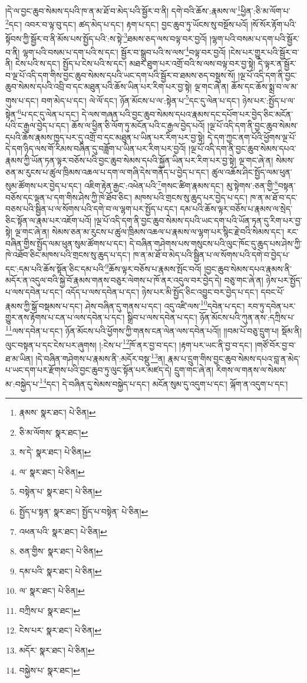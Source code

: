 །དེ་ལ་བྱང་ཆུབ་སེམས་དཔའི་ཁ་ན་མ་ཐོ་བ་མེད་པའི་སྦྱོར་བ་ནི། དགེ་བའི་ཆོས་:རྣམས་ལ་\footnote{རྣམས་  སྣར་ཐང་།  པེ་ཅིན། }ཕྱིན་:ཅི་མ་ལོག་པ་\footnote{ཅི་མ་ལོགས་  སྣར་ཐང་། }དང་། འབར་བ་ལྟ་བུ་དང་། ཚད་མེད་པ་དང་། རྟག་པ་དང་། བྱང་ཆུབ་ཏུ་ཡོངས་སུ་བསྔོས་པའོ། །སོ་སོར་རྟོག་པའི་སྟོབས་ཀྱི་སྦྱོར་བ་ནི་མོས་པས་སྤྱོད་པའི་:ས་སྟེ་\footnote{ས་དེ་  སྣར་ཐང་།  པེ་ཅིན། }ཐམས་ཅད་ལས་བལྟ་བར་བྱའོ། །ལྷག་པའི་བསམ་པ་དག་པའི་སྦྱོར་བ་ནི། ལྷག་པའི་བསམ་པ་དག་པའི་ས་དང་། སྦྱོར་བ་སྒྲུབ་པའི་ས་ལས་\footnote{ལ་  སྣར་ཐང་།  པེ་ཅིན། }བལྟ་བར་བྱའོ། །ངེས་པར་གྱུར་པའི་སྦྱོར་བ་ནི། ངེས་པའི་ས་དང་། སྤྱོད་པ་ངེས་པའི་ས་དང་། མཐར་ཐུག་པར་འགྲོ་བའི་ས་ལས་བལྟ་བར་བྱ་སྟེ། དེ་ལྟར་ན་སྦྱོར་བ་ལྔ་པོ་འདི་དག་གིས་བྱང་ཆུབ་སེམས་དཔའི་ཡང་དག་པའི་སྦྱོར་བ་ཐམས་ཅད་བསྡུས་སོ། །ལྔ་པོ་འདི་དག་ནི་བྱང་ཆུབ་སེམས་དཔའི་འབྲི་བ་དང་མཐུན་པའི་ཆོས་ཡིན་པར་རིག་པར་བྱ་སྟེ། ལྔ་གང་ཞེ་ན། ཆོས་དང་ཆོས་སྨྲ་བ་ལ་མ་གུས་པ་དང་། བག་མེད་པ་དང་། ལེ་ལོ་དང་། ཉོན་མོངས་པ་ལ་:སྟེན་པ་\footnote{བསྟེན་པ་  སྣར་ཐང་།  པེ་ཅིན། }དང་དུ་ལེན་པ་དང་། ཉེས་པར་:སྤྱོད་པ་ལ་སྟེན་\footnote{སྤྱོད་པ་སྟན་  སྣར་ཐང་། སྤྱོད་པ་བསྟེན་  པེ་ཅིན། }པ་དང་དུ་ལེན་པ་དང་། དེ་ལས་གཞན་པའི་བྱང་ཆུབ་སེམས་དཔའ་རྣམས་དང་དཔོག་པར་བྱེད་ཅིང་མངོན་པའི་ང་རྒྱལ་བྱེད་པ་དང་། ཆོས་ལ་ཕྱིན་ཅི་ལོག་ཏུ་མངོན་པའི་ང་རྒྱལ་བྱེད་པའོ། །ལྔ་པོ་འདི་དག་ནི་བྱང་ཆུབ་སེམས་དཔའི་ཆོས་རྣམས་ཁྱད་པར་དུ་འགྲོ་བ་དང་མཐུན་པ་ཡིན་པར་རིག་པར་བྱ་སྟེ། དེ་དག་ཀྱང་ནག་པོའི་ཕྱོགས་ལྔ་པོ་དེ་དག་ཉིད་ལས་གོ་རིམས་བཞིན་དུ་བཟློག་པ་ཡིན་པར་རིག་པར་བྱའོ། །ལྔ་པོ་འདི་དག་ནི་བྱང་ཆུབ་སེམས་དཔའ་རྣམས་ཀྱི་ཡོན་ཏན་ལྟར་བཅོས་པའི་བྱང་ཆུབ་སེམས་དཔའི་སྐྱོན་ཡིན་པར་རིག་པར་བྱ་སྟེ། ལྔ་གང་ཞེ་ན། སེམས་ཅན་མ་རུངས་པ་ཚུལ་ཁྲིམས་འཆལ་པ་དག་ལ་གཞི་དེས་གནོད་པ་བྱེད་པ་དང་། ཚུལ་འཆོས་ཤིང་སྤྱོད་ལམ་ཕུན་སུམ་ཚོགས་པར་བྱེད་པ་དང་། འཇིག་རྟེན་རྒྱང་:འཕེན་པའི་\footnote{འཕན་པའི་  སྣར་ཐང་།  པེ་ཅིན། }གསང་ཚིག་རྣམས་དང་། མུ་སྟེགས་:ཅན་གྱི་\footnote{ཅན་གྱིས་  སྣར་ཐང་།  པེ་ཅིན། }བསྟན་བཅོས་དང་ལྡན་པ་དག་གིས་ཤེས་ཀྱི་ཁེ་ཐོབ་ཅིང་། མཁས་པའི་གྲངས་སུ་ཆུད་པར་བྱེད་པ་དང་། ཁ་ན་མ་ཐོ་བ་དང་བཅས་པའི་སྦྱིན་པ་ལ་སོགས་པའི་དགེ་བ་ལ་ལྷག་པར་སྤྱོད་པ་དང་། དམ་པའི་ཆོས་ལྟར་བཅོས་པ་རྣམས་ལ་སྲེད་ཅིང་སྟོན་ལ་རྣམ་པར་འཇོག་པའོ། །ལྔ་པོ་འདི་དག་ནི་བྱང་ཆུབ་སེམས་དཔའི་ཡང་དག་པའི་ཡོན་ཏན་དུ་རིག་པར་བྱ་སྟེ། ལྔ་གང་ཞེ་ན། སེམས་ཅན་མ་རུངས་པ་ཚུལ་ཁྲིམས་འཆལ་པ་རྣམས་ལ་ལྷག་པར་སྙིང་རྗེ་བའི་སེམས་དང་། རང་བཞིན་གྱིས་སྤྱོད་ལམ་ཕུན་སུམ་ཚོགས་པ་དང་། དེ་བཞིན་གཤེགས་པས་གསུངས་པའི་ལུང་ཁོང་དུ་ཆུད་པས་ཤེས་ཀྱི་ཁེ་འཐོབ་ཅིང་མཁས་པའི་གྲངས་སུ་ཆུད་པ་དང་། ཁ་ན་མ་ཐོ་བ་མེད་པའི་སྦྱིན་པ་ལ་སོགས་པའི་དགེ་བ་བྱེད་པ་དང་:དམ་པའི་ཆོས་སྟོན་ཅིང་དམ་པའི་\footnote{དམ་པའི་  སྣར་ཐང་།  པེ་ཅིན། }ཆོས་ལྟར་བཅོས་པ་རྣམས་སྤོང་བའོ། །བྱང་ཆུབ་སེམས་དཔའ་རྣམས་ནི་མདོར་ན་འདུལ་བའི་སྐྱེ་བོ་རྣམས་གནས་བཅུར་ལེགས་པ་ཁོ་ནར་འདུལ་བར་བྱེད་དེ། བཅུ་གང་ཞེ་ན། ཉེས་པར་སྤྱོད་པ་ལས་དབེན་པ་དང་། འདོད་པ་ལས་དབེན་པ་དང་། ཉེས་པར་མི་སྤྱོད་ཅིང་འབྱུང་བར་བྱེད་པ་དང་། དབང་པོ་རྣམས་ཀྱི་སྒོ་བསྡམས་པ་དང་། ཤེས་བཞིན་དུ་གནས་པ་དང་། འདུ་འཛི་ལས་\footnote{ལ་  སྣར་ཐང་།  པེ་ཅིན། }དབེན་པ་དང་། རབ་ཏུ་དབེན་པར་གྱུར་ནས་རྟོགས་པ་ངན་པ་ལས་དབེན་པ་དང་། སྒྲིབ་པ་ལས་དབེན་པ་དང་། ཉོན་མོངས་པའི་ཀུན་ནས་:དཀྲིས་པ་\footnote{བཀྲིས་པ་  སྣར་ཐང་། }ལས་དབེན་པ་དང་། ཉོན་མོངས་པའི་ཕྱོགས་ཀྱི་གནས་ངན་ལེན་ལས་དབེན་པའོ།། །།བམ་པོ་བཅུ་དྲུག་པ། སྡོམ་ནི། ལུང་བསྟན་པ་དང་ངེས་པར་ཞུགས། །:ངེས་པ་\footnote{ངེས་པར་  སྣར་ཐང་།  པེ་ཅིན། }ཁོ་ནར་བྱ་བ་དང་། །རྟག་པར་ཡང་ནི་བྱ་བ་དང་། །གཙོ་བོར་བྱ་བ་ཐ་མ་ཡིན། །དེ་བཞིན་གཤེགས་པ་རྣམས་ནི་:མདོར་བསྡུ་\footnote{མདོར་  སྣར་ཐང་།  པེ་ཅིན། }ན། རྣམ་པ་དྲུག་གིས་བྱང་ཆུབ་སེམས་དཔའ་བླ་ན་མེད་པ་ཡང་དག་པར་རྫོགས་པའི་བྱང་ཆུབ་ཏུ་ལུང་སྟོན་པར་མཛད་དེ། དྲུག་གང་ཞེ་ན། རིགས་ལ་གནས་ལ་སེམས་མ་:བསྐྱེད་པ་\footnote{བསྐྱེས་པ་  སྣར་ཐང་། }དང་། དེ་བཞིན་དུ་སེམས་བསྐྱེད་པ་དང་། མངོན་སུམ་དུ་འདུག་པ་དང་། ལྐོག་ན་འདུག་པ་དང་། 